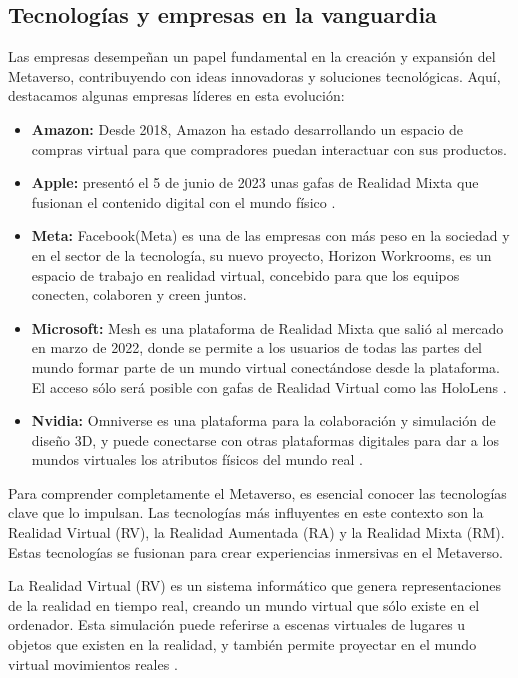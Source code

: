 \documentclass[a4paper,10pt]{article}
\begin{document}
	\subsection{Tecnologías y empresas en la vanguardia}
	{\normalsize 
		Las empresas desempeñan un papel fundamental en la creación y expansión del Metaverso, contribuyendo con ideas innovadoras y soluciones tecnológicas. Aquí, destacamos algunas empresas líderes en esta evolución:\par
		\begin{itemize}
			\item \textbf{Amazon:} Desde 2018, Amazon ha estado desarrollando un espacio de compras virtual para que compradores puedan interactuar con sus productos.
			\item \textbf{Apple:} presentó el 5 de junio de 2023 unas gafas de Realidad Mixta que fusionan el contenido digital con el mundo físico \parencite{apple-2023}.
			\item \textbf{Meta:} Facebook(Meta) es una de las empresas con más peso en la sociedad y en el sector de la tecnología, su nuevo proyecto, Horizon Workrooms, es un espacio de trabajo en realidad virtual, concebido para que los equipos conecten, colaboren y creen juntos.
			\item \textbf{Microsoft:} Mesh es una plataforma de Realidad Mixta que salió al mercado en marzo de 2022, donde se permite a los usuarios de todas las partes del mundo formar parte de un mundo virtual conectándose desde la plataforma. El acceso sólo será posible con gafas de Realidad Virtual como las HoloLens \parencite{martinez2022metaverso}.
			\item \textbf{Nvidia:} Omniverse es una plataforma para la colaboración y simulación de diseño 3D, y puede conectarse con otras plataformas digitales para dar a los mundos virtuales los atributos físicos del mundo real \parencite{roberts2023ar}.
		\end{itemize}
			Para comprender completamente el Metaverso, es esencial conocer las tecnologías clave que lo impulsan. Las tecnologías más influyentes en este contexto son la Realidad Virtual (RV), la Realidad Aumentada (RA) y la Realidad Mixta (RM). Estas tecnologías se fusionan para crear experiencias inmersivas en el Metaverso.\par
		La Realidad Virtual (RV) es un sistema informático que genera representaciones de la realidad en tiempo real, creando un mundo virtual que sólo existe en el ordenador. Esta simulación puede referirse a escenas virtuales de lugares u objetos que existen en la realidad, y también permite proyectar en el mundo virtual movimientos reales \parencite{fib-realidadvirtual}.\par
}
\end{document}
